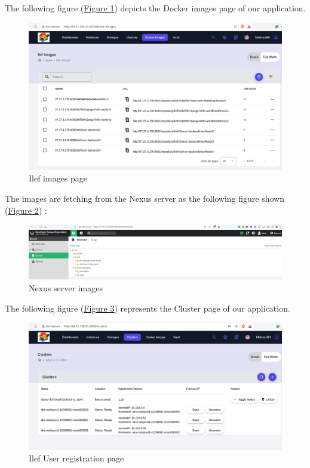 The following figure (\hyperref[fig:docker-images]{Figure \ref{fig:docker-images}})  depicts the Docker images page of our application.
\begin{figure}[h]
  \center
  \includegraphics[width=13cm]{./chapters/sprint3/docker images.png}
  \caption{Ilef images page}
  \label{fig:docker-images}
\end{figure}

The images are fetching  from the Nexus server as the following figure  shown (\hyperref[fig:nexus-server]{Figure \ref{fig:nexus-server}}) :


\begin{figure}[h]
  \center
  \includegraphics[width=13cm]{./chapters/sprint3/nexus.png}
  \caption{Nexus server images}
  \label{fig:nexus-server}
\end{figure}

The following figure (\hyperref[fig:clusters]{Figure \ref{fig:clusters}}) represents the Cluster page of our application.

\begin{figure}[h]
  \center
  \includegraphics[width=13cm]{./chapters/sprint1/clusters.png}
  \caption{Ilef User registration page}
  \label{fig:clusters}
\end{figure}

